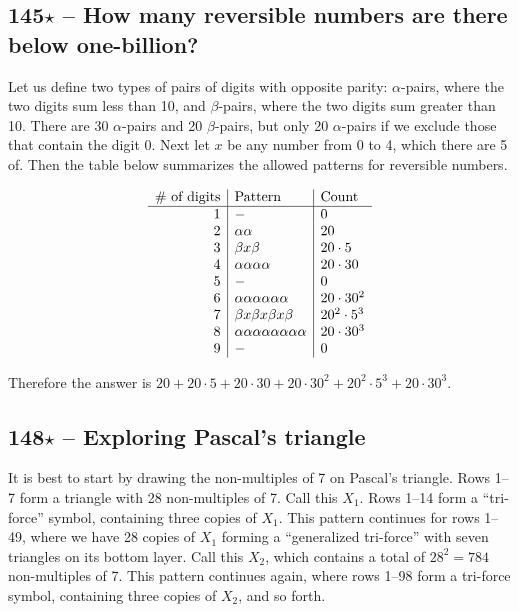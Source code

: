 \documentclass{article}
\begin{document}
\subsection*{145$\star$ -- How many reversible numbers are there below one-billion?} 
Let us define two types of pairs of digits with opposite parity: $\alpha$-pairs, where the two digits sum less than 10, and $\beta$-pairs, where the two digits sum greater than 10. 
There are 30 $\alpha$-pairs and 20 $\beta$-pairs, but only 20 $\alpha$-pairs if we exclude those that contain the digit 0. 
Next let $x$ be any number from 0 to 4, which there are 5 of. 
Then the table below summarizes the allowed patterns for reversible numbers.

\begin{align*}
	\begin{array}{r | l | l} 
	\text{\# of digits} & \text{Pattern} & \text{Count} \\ \hline
	1 & - & 0 \\
	2 & \alpha\alpha & 20 \\
	3 & \beta x \beta & 20\cdot 5 \\
	4 & \alpha\alpha\alpha\alpha & 20 \cdot 30 \\
	5 & - & 0 \\
	6 & \alpha\alpha\alpha\alpha\alpha\alpha & 20 \cdot 30^2 \\
	7 & \beta x \beta x \beta x \beta & 20^2 \cdot 5^3 \\
	8 & \alpha\alpha\alpha\alpha\alpha\alpha\alpha\alpha & 20 \cdot 30^3 \\
	9 & - & 0 \end{array}
\end{align*}

Therefore the answer is $\boxed{20 + 20\cdot 5 + 20 \cdot 30 + 20 \cdot 30^2 + 20^2 \cdot 5^3 + 20 \cdot 30^3}$.

\subsection*{148$\star$ -- Exploring Pascal's triangle}
It is best to start by drawing the non-multiples of 7 on Pascal's triangle.
Rows 1--7 form a triangle with 28 non-multiples of 7.
Call this $X_1$.
Rows 1--14 form a ``tri-force'' symbol, containing three copies of $X_1$.
This pattern continues for rows 1--49, where we have 28 copies of $X_1$ forming a ``generalized tri-force'' with seven triangles on its bottom layer.
Call this $X_2$, which contains a total of $28^2 = 784$ non-multiples of 7.
This pattern continues again, where rows 1--98 form a tri-force symbol, containing three copies of $X_2$, and so forth. \\
\end{document}

